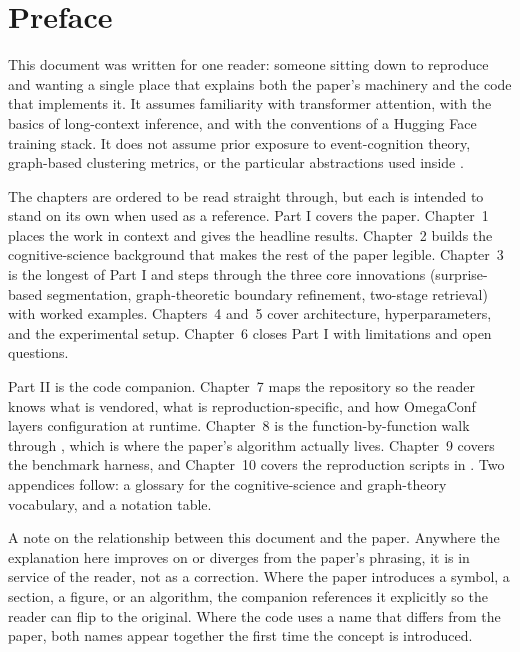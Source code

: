 \section*{Preface}

This document was written for one reader: someone sitting down to reproduce \textcite{fountas2025emllm} and wanting a single place that explains both the paper's machinery and the code that implements it. It assumes familiarity with transformer attention, with the basics of long-context inference, and with the conventions of a Hugging Face training stack. It does not assume prior exposure to event-cognition theory, graph-based clustering metrics, or the particular abstractions used inside .

The chapters are ordered to be read straight through, but each is intended to stand on its own when used as a reference. Part I covers the paper. Chapter~1 places the work in context and gives the headline results. Chapter~2 builds the cognitive-science background that makes the rest of the paper legible. Chapter~3 is the longest of Part I and steps through the three core innovations (surprise-based segmentation, graph-theoretic boundary refinement, two-stage retrieval) with worked examples. Chapters~4 and~5 cover architecture, hyperparameters, and the experimental setup. Chapter~6 closes Part I with limitations and open questions.

Part II is the code companion. Chapter~7 maps the repository so the reader knows what is vendored, what is reproduction-specific, and how OmegaConf layers configuration at runtime. Chapter~8 is the function-by-function walk through , which is where the paper's algorithm actually lives. Chapter~9 covers the benchmark harness, and Chapter~10 covers the reproduction scripts in . Two appendices follow: a glossary for the cognitive-science and graph-theory vocabulary, and a notation table.

A note on the relationship between this document and the paper. Anywhere the explanation here improves on or diverges from the paper's phrasing, it is in service of the reader, not as a correction. Where the paper introduces a symbol, a section, a figure, or an algorithm, the companion references it explicitly so the reader can flip to the original. Where the code uses a name that differs from the paper, both names appear together the first time the concept is introduced.

